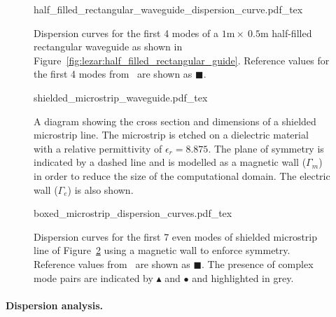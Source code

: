 \begin{figure}
\bwfig
 \centering
  \def\svgwidth{\largefig}
  {half_filled_rectangular_waveguide_dispersion_curve.pdf_tex}
 \caption{Dispersion curves for the first 4 modes of a
 $1\text{m}\times~0.5\text{m}$ half-filled rectangular waveguide as shown
 in Figure~\ref{fig:lezar:half_filled_rectangular_guide}. Reference values
 for the first 4 modes from~\citet{Jin2002} are shown as $\blacksquare$.}
 \label{fig:lezar:half_loaded_rectangular_dispersion_curves}
\end{figure}

\begin{figure}
\bwfig
        \centering
    \def\svgwidth{\smallfig}
    {shielded_microstrip_waveguide.pdf_tex}
    \caption{A diagram showing the cross section and dimensions of a
    shielded microstrip line. The microstrip is etched on a dielectric
    material with a relative permittivity of $\epsilon_r = 8.875$. The
    plane of symmetry is indicated by a dashed line and is modelled
    as a magnetic wall ($\Gamma_m$) in order to reduce the size of the
    computational domain. The electric wall ($\Gamma_e$) is also shown.}
    \label{fig:lezar:shielded_microstrip}
\end{figure}\clearpage

\begin{figure}
\bwfig
 \centering
  \def\svgwidth{\largefig}
    {boxed_microstrip_dispersion_curves.pdf_tex}
 \caption{Dispersion curves for the first 7 even modes of shielded
 microstrip line of Figure~\ref{fig:lezar:shielded_microstrip}
 using a magnetic wall to enforce symmetry. Reference values
 from~\citet{PelosiCoccioliSelleri1998} are shown as $\blacksquare$. The
 presence of complex mode pairs are indicated by $\blacktriangle$ and
 $\bullet$ and highlighted in grey.}
 \label{fig:lezar:shielded_microstrip_dispersion_curves}
\end{figure}
\label{lezar:sec:shielded_microstrip|)}


\paragraph{Dispersion analysis.}

